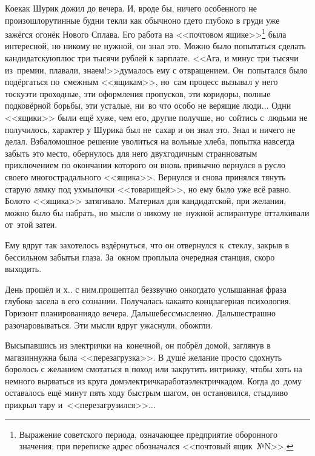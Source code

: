 {%
	Кое\sdash как Шурик дожил до вечера. И, вроде бы, ничего особенного не произошло\mdash рутинные будни текли как обычно\mdash но где\sdash то глубоко в груди уже зажёгся огонёк Нового Сплава. Его работа на <<почтовом ящике>>\footnote{Выражение советского периода, означающее предприятие оборонного значения; при переписке адрес обозначался <<почтовый ящик~№N>>.} была интересной, но никому не нужной, он знал это. Можно было попытаться сделать кандидатскую\mdash плюс три тысячи рублей к зарплате. <<Ага, и минус три тысячи из~премии, плавали, знаем!>>\mdash думалось ему с отвращением. Он~попытался было подёргаться по~смежным <<ящикам>>, но~сам процесс вызывал у него тоску\mdash эти проходные, эти оформления пропусков, эти коридоры, полные подковёрной борьбы, эти усталые, ни~во что особо не верящие люди$\ldots$ Одни <<ящики>> были ещё хуже, чем его, другие получше, но~сойтись с~людьми не получилось, характер у Шурика был не~сахар и он знал это. Знал и ничего не делал. Взбаломошное решение уволиться на вольные хлеба, попытка навсегда забыть это место, обернулось для него двухгодичным странноватым приключением по окончании которого он вновь привычно вернулся в русло своего многострадального <<ящика>>. Вернулся и снова принялся тянуть старую лямку под ухмылочки <<товарищей>>, но ему было уже всё равно. Болото <<ящика>> затягивало. Материал для кандидатской, при желании, можно было бы набрать, но мысли о никому не~нужной аспирантуре отталкивали от~этой затеи.%
	
	Ему вдруг так захотелось вздёрнуться, что он отвернулся к~стеклу, закрыв в бессильном забытьи глаза. За~окном проплыла очередная станция, скоро выходить.
	
	\diagdash День прошёл и х.. с ним.\mdash прошептал беззвучно он\mdash когда\sdash то услышанная фраза глубоко засела в его сознании. Получалась какая\sdash то концлагерная психология. Горизонт планирования\mdash до вечера. Дальше\mdash бессмысленно. Дальше\mdash страшно разочаровываться. Эти мысли вдруг ужаснули, обожгли. %
	
	Высыпавшись из электрички на~конечной, он побрёл домой, заглянув в магазин\mdash нужна была <<перезагрузка>>. В душ\'е желание просто сдохнуть боролось с желанием смотаться в поход или закрутить интрижку, чтобы хоть на немного вырваться из круга дом\nbdash электричка\nbdash работа\nbdash электричка\nbdash дом. Когда до~дому оставалось ещё минут пять ходу быстрым шагом, он остановился, стыдливо прикрыл тару и~<<перезагрузился>>$\ldots$
	
}

